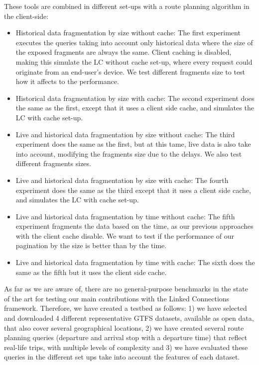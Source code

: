 \documentclass[sw]{iosart2x}
\begin{document}
These tools are combined in different set-ups with a route planning algorithm in the client-side:
\begin{itemize}
\item Historical data fragmentation by size without cache: The first experiment executes the queries taking into account only historical data where the size of the exposed fragments are always the same. Client caching is disabled, making this simulate the LC without cache set-up, where every request could originate from an end-user's device. We test different fragments size to test how it affects to the performance.
\item Historical data fragmentation by size with cache: The second experiment does the same as the first, except that it uses a client side cache, and simulates the LC with cache set-up.
\item Live and historical data fragmentation by size without cache: The third experiment does the same as the first, but at this tame, live data is also take into account, modifying the fragments size due to the delays. We also test different fragments sizes.
\item Live and historical data fragmentation by size with cache: The fourth experiment does the same as the third except that it uses a client side cache, and simulates the LC with cache set-up.
\item Live and historical data fragmentation by time without cache: The fifth experiment fragments the data based on the time, as our previous approaches with the client cache disable. We want to test if the performance of our pagination by the size is better than by the time.
\item Live and historical data fragmentation by time with cache: The sixth does the same as the fifth but it uses the client side cache.
\end{itemize}

As far as we are aware of, there are no general-purpose benchmarks in the state of the art for testing our main contributions with the Linked Connections framework. Therefore, we have created a testbed as follows: 1) we have selected and downloaded 4 different representative GTFS datasets, available as open data, that also cover several geographical locations, 2) we have created several route planning queries (departure and arrival stop with a departure time) that reflect real-life trips, with multiple levels of complexity and 3) we have evaluated these queries in the different set ups take into account the features of each dataset.
\end{document}
